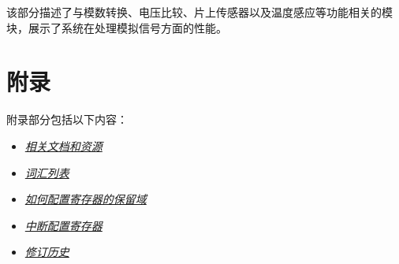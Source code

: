 \documentclass[openany, 10pt]{book}
\begin{document}
该部分描述了与模数转换、电压比较、片上传感器以及温度感应等功能相关的模块，展示了系统在处理模拟信号方面的性能。






\part{附录}\label{appendix}

附录部分包括以下内容：

\begin{itemize}
    \item \hyperref[sec:resources]{\textit{相关文档和资源}}
    \item \hyperref[glossary]{\textit{词汇列表}}
    \item \hyperref[programming-reserved-field]{\textit{如何配置寄存器的保留域}}
    \item \hyperref[interrupt-config-registers]{\textit{中断配置寄存器}}
    \item \hyperref[revision-history]{\textit{修订历史}}
\end{itemize}



\clearpage


\clearpage


\clearpage


\clearpage


\clearpage


\clearpage

\end{document}
